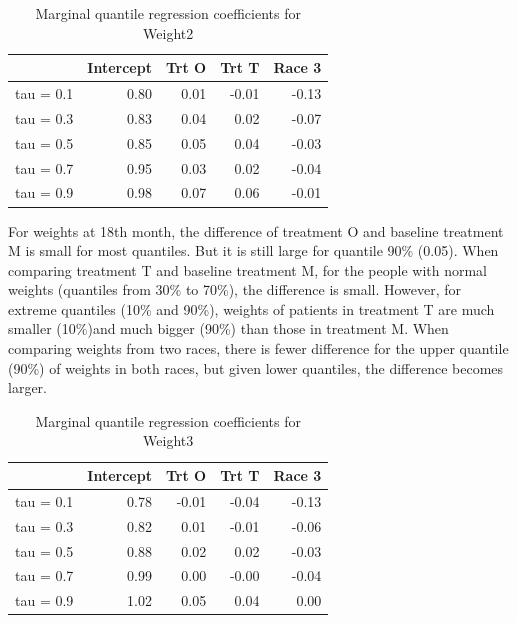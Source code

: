 \documentclass[12pt]{article}
\begin{document}
\begin{table}[ht]
\begin{center}
\caption{Marginal quantile regression coefficients for Weight2}\label{tab:w2}
\begin{tabular}{rrrrr}
  \hline
            & Intercept & Trt O & Trt T & Race 3 \\
  \hline
tau = 0.1   & 0.80      & 0.01  & -0.01 & -0.13  \\
  tau = 0.3 & 0.83      & 0.04  & 0.02  & -0.07  \\
  tau = 0.5 & 0.85      & 0.05  & 0.04  & -0.03  \\
  tau = 0.7 & 0.95      & 0.03  & 0.02  & -0.04  \\
  tau = 0.9 & 0.98      & 0.07  & 0.06  & -0.01  \\
   \hline
\end{tabular}
\end{center}
\end{table}

For weights at 18th month, the difference of treatment O and baseline treatment M is small for most quantiles. But it is still large for quantile 90\% (0.05). When comparing treatment T and baseline treatment M, for the  people with normal weights (quantiles from  30\% to 70\%), the difference is small. However, for extreme quantiles (10\% and 90\%), weights of patients in treatment T are much smaller (10\%)and much bigger (90\%) than those in treatment M. When comparing weights from two races,  there is fewer difference for the upper quantile (90\%) of weights in both races, but given lower quantiles, the difference becomes larger. 

\begin{table}[ht]
\begin{center}
\caption{Marginal quantile regression coefficients for Weight3}\label{tab:w3}
\begin{tabular}{rrrrr}
  \hline
 & Intercept & Trt O & Trt T & Race 3 \\
  \hline
tau = 0.1 & 0.78 & -0.01 & -0.04 & -0.13 \\
  tau = 0.3 & 0.82 & 0.01 & -0.01 & -0.06 \\
  tau = 0.5 & 0.88 & 0.02 & 0.02 & -0.03 \\
  tau = 0.7 & 0.99 & 0.00 & -0.00 & -0.04 \\
  tau = 0.9 & 1.02 & 0.05 & 0.04 & 0.00 \\
   \hline
\end{tabular}
\end{center}
\end{table}
\end{document}

